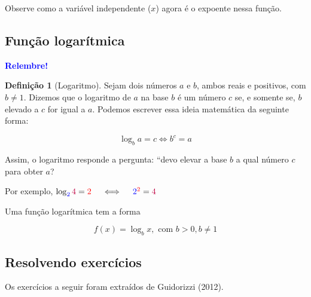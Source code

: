 \documentclass[12pt,openright,twoside,a4paper]{article}
\theoremstyle{definition}
\newtheorem{definition}{Definição}[section]
\begin{document}
	Observe como a variável independente ($x$) agora é o expoente nessa função.
	
	\subsection{Função logarítmica}
	
	\begin{snugshade}
		\textbf{\textcolor{blue}{Relembre!}}
		
		\begin{definition}[Logaritmo]
			Sejam dois números $a$ e $b$, ambos reais e positivos, com $b \neq 1$. Dizemos que o logaritmo de $a$ na base $b$ é um número $c$ se, e somente se, $b$ elevado a $c$ for igual a $a$.
			Podemos escrever essa ideia matemática da seguinte forma:
			
			\begin{equation*}
				\log_ba = c \iff b^c = a
			\end{equation*}        
		\end{definition}
		
		Assim, o logaritmo responde a pergunta: ``devo elevar a base $b$ a qual número $c$ para obter $a$?
		
		Por exemplo, $\log_{\textcolor{blue}{2}}\textcolor{purple}{4} = \textcolor{red}{2}
		\quad \iff \quad
		\textcolor{blue}{2}^{\textcolor{red}{2}} = \textcolor{purple}{4}$
	\end{snugshade}
	
	
	Uma função logarítmica tem a forma
	
	\begin{equation}
		\boxed{f(x) = \log_bx, \text{ com } b > 0, b \neq 1}
	\end{equation}
	
	\subsection{Resolvendo exercícios}
	Os exercícios a seguir foram extraídos de Guidorizzi (2012).
	
\end{document}
